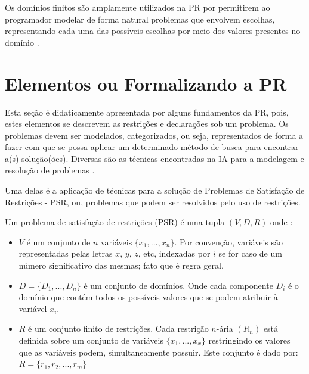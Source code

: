 Os domínios finitos são amplamente utilizados na PR por permitirem ao programador modelar de forma natural problemas que envolvem escolhas, representando cada uma das possíveis escolhas por meio dos valores presentes no domínio \cite{stuckey}.



 \section{Elementos ou Formalizando a  PR}

Esta seção é   didaticamente apresentada por alguns fundamentos da PR, pois, estes elementos
se descrevem as restrições  e declarações sob um problema. Os problemas devem ser modelados, categorizados, ou seja, representados de forma a fazer com que se possa aplicar um determinado método de busca para encontrar a(s) solução(ões). Diversas são as técnicas encontradas na IA para a modelagem e resolução de problemas \cite{RusNorv2010}.

Uma delas é a aplicação de técnicas para a solução de Problemas de Satisfação de Restrições - PSR, ou, problemas que podem ser resolvidos pelo uso de restrições.

Um problema de satisfação de restrições (PSR) é uma tupla $(V,D,R)$ onde \cite{apt_2003}:

\begin{itemize}

 \item $V$ é um conjunto de $n$ variáveis $\lbrace x_{1}, ..., x_{n} \rbrace$. Por convenção, variáveis  são representadas pelas letras $x$, $y$, $z$, etc, indexadas por $i$ se for caso de um número
 significativo das mesmas; fato que é regra geral.
 

 \item $D = \lbrace D_{1}, ..., D_{n} \rbrace$ é um conjunto de domínios. Onde cada componente $D_{i}$ é o domínio que contém todos os possíveis valores que se podem atribuir à variável $x_{i}$.


 \item $R$ é um conjunto finito de restrições. Cada restrição $n$-ária $(R_{n})$ está definida sobre um conjunto de variáveis $\lbrace x_{1}, ..., x_{x} \rbrace$ restringindo os valores que as variáveis podem, simultaneamente possuir. Este conjunto é dado por: $R = \{ r_1, r_2, ..., r_m \}$

\end{itemize}


